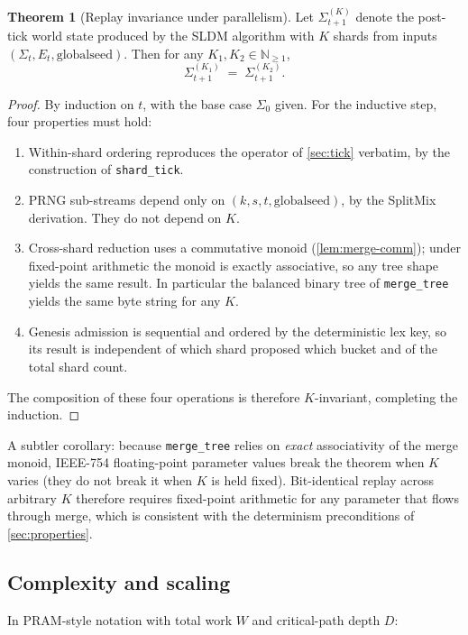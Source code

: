 \documentclass[journal,onecolumn,11pt]{IEEEtran}
\theoremstyle{definition}
\newtheorem{theorem}{Theorem}
\begin{document}
\begin{theorem}[Replay invariance under parallelism]\label{thm:sldm-det}
Let $\Sigma^{(K)}_{t+1}$ denote the post-tick world state produced by the SLDM algorithm with $K$ shards from inputs $(\Sigma_t, E_t, \mathrm{globalseed})$. Then for any $K_1, K_2 \in \mathbb{N}_{\ge 1}$,
\[
\Sigma^{(K_1)}_{t+1} \;=\; \Sigma^{(K_2)}_{t+1}.
\]
\end{theorem}

\begin{proof}
By induction on $t$, with the base case $\Sigma_0$ given. For the inductive step, four properties must hold:
\begin{enumerate}[leftmargin=1.5em,nosep]
\item Within-shard ordering reproduces the operator of \cref{sec:tick} verbatim, by the construction of \texttt{shard\_tick}.
\item PRNG sub-streams depend only on $(k, s, t, \mathrm{globalseed})$, by the SplitMix derivation. They do not depend on $K$.
\item Cross-shard reduction uses a commutative monoid (\cref{lem:merge-comm}); under fixed-point arithmetic the monoid is exactly associative, so any tree shape yields the same result. In particular the balanced binary tree of \texttt{merge\_tree} yields the same byte string for any $K$.
\item Genesis admission is sequential and ordered by the deterministic lex key, so its result is independent of which shard proposed which bucket and of the total shard count.
\end{enumerate}
The composition of these four operations is therefore $K$-invariant, completing the induction.
\end{proof}

A subtler corollary: because \texttt{merge\_tree} relies on \emph{exact} associativity of the merge monoid, IEEE-754 floating-point parameter values break the theorem when $K$ varies (they do not break it when $K$ is held fixed). Bit-identical replay across arbitrary $K$ therefore requires fixed-point arithmetic for any parameter that flows through merge, which is consistent with the determinism preconditions of \cref{sec:properties}.

\subsection{Complexity and scaling}

In PRAM-style notation with total work $W$ and critical-path depth $D$:
\end{document}

